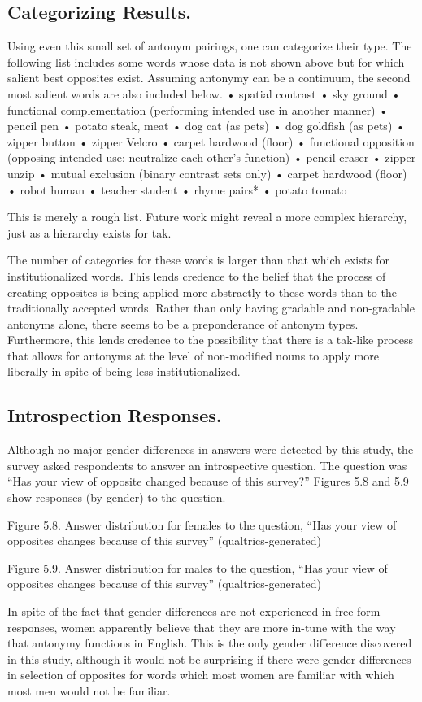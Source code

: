 \subsection {Categorizing Results.} Using even this small set of antonym pairings, one can categorize their type.  The following list includes some words whose data is not shown above but for which salient best opposites exist.  Assuming antonymy can be a continuum, the second most salient words are also included below.
	•	spatial contrast
	•	sky \opp ground
	•	functional complementation (performing intended use in another manner) 
	•	pencil \opp pen
	•	potato \opp steak, meat
	•	dog \opp cat (as pets)
	•	dog \opp goldfish (as pets)
	•	zipper \opp button
	•	zipper \opp Velcro
	•	carpet \opp hardwood (floor)
	•	functional opposition (opposing intended use; neutralize each other’s function) 
	•	pencil \opp eraser
	•	zipper \opp unzip
	•	mutual exclusion (binary contrast sets only)
	•	carpet \opp hardwood (floor)
	•	robot \opp human
	•	teacher \opp student
	•	rhyme pairs*
	•	potato \opp tomato

This is merely a rough list.  Future work might reveal a more complex hierarchy, just as a hierarchy exists for tak.  

The number of categories for these words is larger than that which exists for institutionalized words.  This lends credence to the belief that the process of creating opposites is being applied more abstractly to these words than to the traditionally accepted words. Rather than only having gradable and non-gradable antonyms alone, there seems to be a preponderance of antonym types.  Furthermore, this lends credence to the possibility that there is a tak-like process that allows for antonyms at the level of non-modified nouns to apply more liberally in spite of being less institutionalized.

\subsection {Introspection Responses.} Although no major gender differences in answers were detected by this study, the survey asked respondents to answer an introspective question.  The question was “Has your view of opposite changed because of this survey?”  Figures 5.8 and 5.9 show responses (by gender) to the question.  

Figure 5.8. Answer distribution for females to the question, “Has your view of opposites changes because of this survey” (qualtrics-generated)

  Figure 5.9. Answer distribution for males to the question, “Has your view of opposites changes because of this survey” (qualtrics-generated)

In spite of the fact that gender differences are not experienced in free-form responses, women apparently believe that they are more in-tune with the way that antonymy functions in English.  This is the only gender difference discovered in this study, although it would not be surprising if there were gender differences in selection of opposites for words which most women are familiar with which most men would not be familiar.